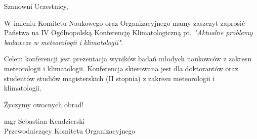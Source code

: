 \Large
\raggedright Szanowni Uczestnicy,

\vspace{1cm}

W imieniu Komitetu Naukowego oraz Organizacyjnego mamy zaszczyt zaprosić Państwa na IV
Ogólnopolską  Konferencję  Klimatologiczną pt. \emph{ "Aktualne    problemy    badawcze w meteorologii i klimatologii"}.

Celem  konferencji  jest  prezentacja  wyników  badań  młodych  naukowców  z  zakresu meteorologii  i  klimatologii. Konferencja  skierowana jest  dla  doktorantów  oraz  studentów  studiów magisterskich (II stopnia) z zakresu meteorologii i klimatologii. 

\vspace{1cm}

Życzymy owocnych obrad!

\vspace{4.5cm}

\large
\begin{flushright}
mgr Sebastian Kendzierski \\
Przewodniczący Komitetu Organizacyjnego \\ 
\end{flushright}

